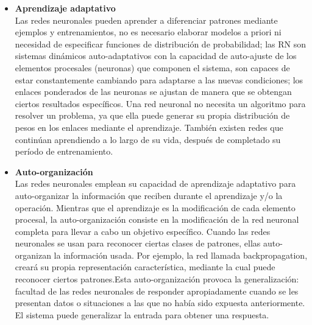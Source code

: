 \begin{itemize}
 \item {\textbf{ Aprendizaje adaptativo}\\
 Las redes neuronales pueden aprender a diferenciar patrones mediante ejemplos y entrenamientos, no es necesario elaborar modelos a priori 
 ni necesidad de especificar funciones de distribución de probabilidad; las RN son sistemas dinámicos auto-adaptativos con la capacidad de 
 auto-ajuste de los elementos procesales (neuronas) que componen el sistema, son capaces de estar constantemente
cambiando para adaptarse a las nuevas condiciones; los enlaces ponderados de las neuronas se ajustan de manera que se obtengan ciertos 
resultados específicos. Una red neuronal no necesita un algoritmo para resolver un problema, ya que ella puede generar su propia distribución
de pesos en los enlaces mediante el aprendizaje. También existen redes que continúan aprendiendo a lo largo de su vida, después de completado 
su período de entrenamiento.
 }
\item {\textbf{ Auto-organización }\\
 Las redes neuronales emplean su capacidad de aprendizaje adaptativo para auto-organizar la información que reciben durante el aprendizaje 
 y/o la operación. Mientras que el aprendizaje es la modificación de cada elemento procesal, la auto-organización consiste en la modificación
 de la red neuronal completa para llevar a cabo un objetivo específico.
Cuando las redes neuronales se usan para reconocer ciertas clases de patrones,
ellas auto-organizan la información usada. Por ejemplo, la red llamada backpropagation,
creará su propia representación característica, mediante la cual puede reconocer ciertos
patrones.Esta auto-organización provoca la generalización: facultad de las redes
neuronales de responder apropiadamente cuando se les presentan datos o situaciones a
las que no había sido expuesta anteriormente. El sistema puede generalizar la entrada
para obtener una respuesta. 

}
\end{itemize}
